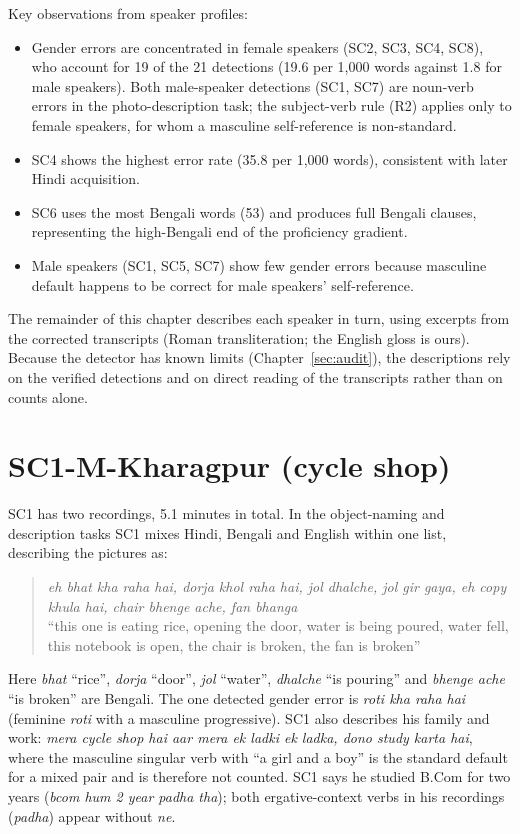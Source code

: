 \documentclass[11pt,a4paper]{report}
\begin{document}
Key observations from speaker profiles:
\begin{itemize}
  \item Gender errors are concentrated in female speakers (SC2, SC3, SC4, SC8), who account for 19 of the 21 detections (19.6 per 1,000 words against 1.8 for male speakers). Both male-speaker detections (SC1, SC7) are noun-verb errors in the photo-description task; the subject-verb rule (R2) applies only to female speakers, for whom a masculine self-reference is non-standard.
  \item SC4 shows the highest error rate (35.8 per 1,000 words), consistent with later Hindi acquisition.
  \item SC6 uses the most Bengali words (53) and produces full Bengali clauses, representing the high-Bengali end of the proficiency gradient.
  \item Male speakers (SC1, SC5, SC7) show few gender errors because masculine default happens to be correct for male speakers' self-reference.
\end{itemize}

The remainder of this chapter describes each speaker in turn, using excerpts from the corrected transcripts (Roman transliteration; the English gloss is ours). Because the detector has known limits (Chapter~\ref{sec:audit}), the descriptions rely on the verified detections and on direct reading of the transcripts rather than on counts alone.

\section{SC1-M-Kharagpur (cycle shop)}

SC1 has two recordings, 5.1 minutes in total. In the object-naming and description tasks SC1 mixes Hindi, Bengali and English within one list, describing the pictures as:
\begin{quote}
  \textit{eh bhat kha raha hai, dorja khol raha hai, jol dhalche, jol gir gaya, eh copy khula hai, chair bhenge ache, fan bhanga}\\
  ``this one is eating rice, opening the door, water is being poured, water fell, this notebook is open, the chair is broken, the fan is broken''
\end{quote}
Here \textit{bhat} ``rice'', \textit{dorja} ``door'', \textit{jol} ``water'', \textit{dhalche} ``is pouring'' and \textit{bhenge ache} ``is broken'' are Bengali. The one detected gender error is \textit{roti kha raha hai} (feminine \textit{roti} with a masculine progressive). SC1 also describes his family and work: \textit{mera cycle shop hai aar mera ek ladki ek ladka, dono study karta hai}, where the masculine singular verb with ``a girl and a boy'' is the standard default for a mixed pair and is therefore not counted. SC1 says he studied B.Com for two years (\textit{bcom hum 2 year padha tha}); both ergative-context verbs in his recordings (\textit{padha}) appear without \textit{ne}.
\end{document}
